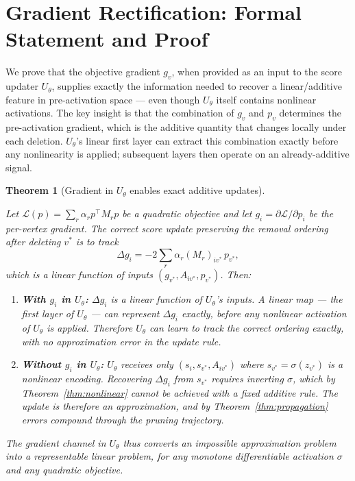 \documentclass[11pt]{article}
\newcommand{\change}[1]{{\color{red}#1}}
\theoremstyle{plain}
\newtheorem{theorem}{Theorem}[section]
\theoremstyle{definition}
\theoremstyle{remark}
\begin{document}



\appendix

\section{Gradient Rectification: Formal Statement and Proof}
\label{app:rectification}

\change{We prove that the objective gradient $g_v$, when provided as an input to the
  score updater $U_\theta$, supplies exactly the information needed to recover a
  linear/additive feature in pre-activation space --- even though $U_\theta$ itself
  contains nonlinear activations. The key insight is that the combination of $g_v$ and
  $p_v$ determines the pre-activation gradient, which is the additive quantity that
  changes locally under each deletion. $U_\theta$'s linear first layer can extract this
  combination exactly before any nonlinearity is applied; subsequent layers then operate
on an already-additive signal.}

\begin{theorem}[Gradient in $U_\theta$ enables exact additive updates]
  \label{thm:rectification}
  \change{Let $\mathcal{L}(p) = \sum_r \alpha_r p^\top M_r p$ be a quadratic objective
    and let $g_i = \partial\mathcal{L}/\partial p_i$ be the per-vertex gradient. The
    correct score update preserving the removal ordering after deleting $v^*$ is to track
    \begin{equation}
      \Delta g_i = -2\sum_r \alpha_r (M_r)_{iv^*}\, p_{v^*},
      \label{eq:delta_g_app}
    \end{equation}
    which is a \emph{linear} function of inputs $(g_{v^*}, A_{iv^*}, p_{v^*})$. Then:
    \begin{enumerate}
      \item \textbf{With $g_i$ in $U_\theta$:} $\Delta g_i$ is a linear function of
        $U_\theta$'s inputs. A linear map --- the first layer of $U_\theta$ --- can
        represent $\Delta g_i$ exactly, before any nonlinear activation of $U_\theta$ is
        applied. Therefore $U_\theta$ can learn to track the correct ordering exactly,
        with no approximation error in the update rule.
      \item \textbf{Without $g_i$ in $U_\theta$:} $U_\theta$ receives only $(s_i,
        s_{v^*}, A_{iv^*})$ where $s_{v^*} = \sigma(z_{v^*})$ is a nonlinear encoding.
        Recovering $\Delta g_i$ from $s_{v^*}$ requires inverting $\sigma$, which by
        Theorem~\ref{thm:nonlinear} cannot be achieved with a fixed additive rule. The
        update is therefore an approximation, and by Theorem~\ref{thm:propagation} errors
        compound through the pruning trajectory.
    \end{enumerate}
    The gradient channel in $U_\theta$ thus converts an impossible approximation problem
    into a representable linear problem, for any monotone differentiable activation
  $\sigma$ and any quadratic objective.}
\end{theorem}
\end{document}
